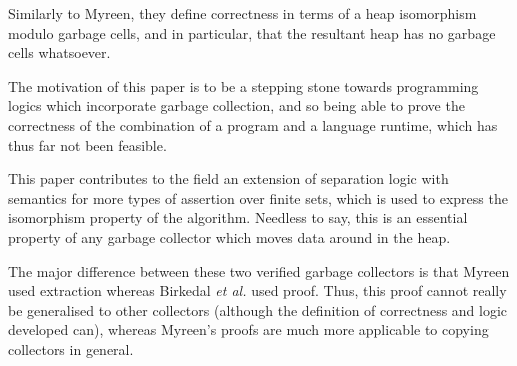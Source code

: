 Similarly to Myreen, they define correctness in terms of a heap
isomorphism modulo garbage cells, and in particular, that the
resultant heap has no garbage cells whatsoever.

The motivation of this paper is to be a stepping stone towards
programming logics which incorporate \gls{garbage collection}, and so
being able to prove the correctness of the combination of a program
and a language runtime, which has thus far not been feasible.

This paper contributes to the field an extension of separation logic
with semantics for more types of assertion over finite sets, which is
used to express the isomorphism property of the algorithm. Needless to
say, this is an essential property of any garbage collector which
moves data around in the heap.

The major difference between these two verified garbage collectors is
that Myreen used extraction whereas Birkedal \textit{et al.} used
proof. Thus, this proof cannot really be generalised to other
collectors (although the definition of correctness and logic developed
can), whereas Myreen's proofs are much more applicable to copying
collectors in general.
